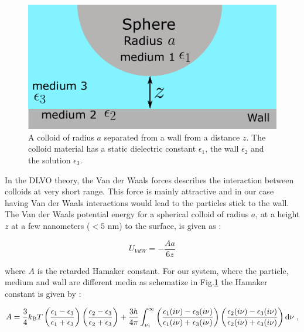 \begin{figure}[h]
	\centering
	\includegraphics{02_body/chapter3/images/vdw_scheme.pdf}
	\caption{A colloid of radius $a$ separated from a wall from a distance $z$. The colloid material has a static dielectric constant $\epsilon_1$, the wall $\epsilon_2$ and the solution $\epsilon_3$. }
	\label{Fig:vdw}
\end{figure}

In the DLVO theory, the Van der Waals forces describes the interaction between colloids at very short range. This force is mainly attractive and in our case having Van der Waals interactions would lead to the particles stick to the wall. The Van der Waals potential energy for a spherical colloid of radius $a$, at a height $z$  at a few nanometers ($< 5$ nm) to the surface, is given as \cite{israelachvili_intermolecular_2015}:

\begin{equation}
	U_{VdW} = -\frac{A a}{6z} 
\end{equation}

where $A$ is the retarded Hamaker constant. For our system, where the particle, medium and wall are different media as schematize in Fig.\ref{Fig:vdw} the Hamaker constant is given by \cite{israelachvili_intermolecular_2015}:

\begin{equation}
	A = \frac{3}{4} k_\mathrm{B}T \left(
	\frac{\epsilon_1 - \epsilon_3}{\epsilon_1 + \epsilon_3}
	\right)
	\left(
	\frac{\epsilon_2 - \epsilon_3}{\epsilon_2 + \epsilon_3}
	\right)
	+
	\frac{3h}{4\pi}
	\int_{\nu_1}^{\infty}
	\left(
	\frac{\epsilon_1 (i\nu) - \epsilon_3 (i\nu)}{\epsilon_1 (i\nu) + \epsilon_3 (i\nu)}
	\right)
	\left(
	\frac{\epsilon_2 (i\nu) - \epsilon_3 (i\nu)}{\epsilon_2 (i\nu) + \epsilon_3 (i\nu)}
	\right)
	\textnormal{d}\nu ~,
\end{equation}

